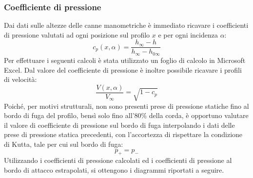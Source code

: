 \subsubsection{Coefficiente di pressione}
Dai dati sulle altezze delle canne manometriche è immediato ricavare i coefficienti di pressione valutati ad ogni posizione sul profilo $x$ e per ogni incidenza $\alpha$:
\begin{equation*}
    c_p(x,\alpha) = \frac{h_\infty-h}{h_\infty - h_{0\infty}}
\end{equation*}
Per effettuare i seguenti calcoli è stata utilizzato un foglio di calcolo in Microsoft Excel. Dal valore del coefficiente di pressione è inoltre possibile ricavare i profili di velocità:
\begin{equation*}
    \frac{V(x,\alpha)}{V_\infty} = \sqrt{1-c_p}
\end{equation*}
Poiché, per motivi strutturali, non sono presenti prese di pressione statiche fino al bordo di fuga del profilo, bensì solo fino all'80\% della corda, è opportuno valutare il valore di coefficiente di pressione sul bordo di fuga interpolando i dati delle prese di pressione statica precedenti, con l'accortezza di rispettare la condizione di Kutta, tale per cui sul bordo di fuga:
\begin{equation*}
    p_+ = p_-
\end{equation*}
Utilizzando i coefficienti di pressione calcolati ed i coefficienti di pressione al bordo di attacco estrapolati, si ottengono i diagrammi riportati a seguire.
